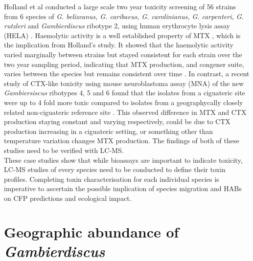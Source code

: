\documentclass[12pt]{article}
\begin{document}
Holland et al conducted a large scale two year toxicity screening of 56 strains from 6 species of \emph{G. belizeanus, G. caribaeus, G. carolinianus, G. carpenteri, G. rutzleri} and  \emph{Gambierdiscus} ribotype 2, using human erythrocyte lysis assay (HELA) \cite{holland2013differences}. Haemolytic activity is a well established property of MTX \cite{igarashi1999mechanisms}, which is the implication from Holland's study. It showed that the haemolytic activity varied marginally between strains but stayed consistent for each strain over the two year sampling period, indicating that MTX production, and congener suite, varies between the species but remains consistent over time \cite{holland2013differences}.
In contrast, a recent study of CTX-like toxicity using mouse neuroblastoma assay (MNA) of the new \emph{Gambiersiscus} ribotypes 4, 5 and 6 found that the isolates from a ciguateric site were up to 4\- fold more toxic compared to isolates from a geographycally closely related non-ciguateric reference site \cite{xu2014distribution}. This observed difference in MTX and CTX production staying constant and varying respectively, could be due to CTX production increasing in a ciguateric setting, or something other than temperature variation changes MTX production. The findings of both of these studies need to be verified with LC-MS. \\
These case studies show that while bioassays are important to indicate toxicity, LC-MS studies of every species need to be conducted to define their toxin profiles. Completing toxin characterisation for each individual species is imperative to ascertain the possible implication of species migration and HABs on CFP predictions and ecological impact. 

\section{Geographic abundance of \emph{Gambierdiscus}}
\end{document}
